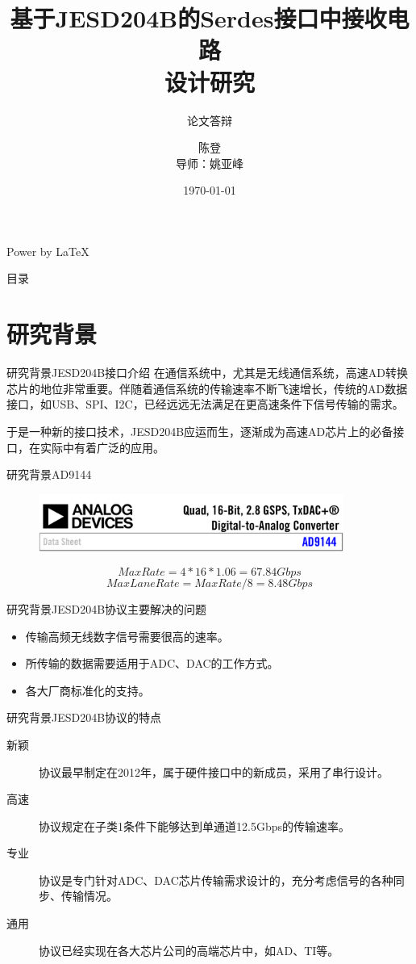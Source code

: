 \documentclass{beamer}
\title{基于JESD204B的Serdes接口中接收电路 \\ 设计研究}
\subtitle{论文答辩}
\author{陈登 \\ 导师：姚亚峰}
\date{\today}
\begin{document}
\begin{frame}
	\titlepage
	Power by \LaTeX
\end{frame}

\begin{frame}{目录}
	\tableofcontents
\end{frame}

\section{研究背景}

\begin{frame}{研究背景}{JESD204B接口介绍}
在通信系统中，尤其是无线通信系统，高速AD转换芯片的地位非常重要。伴随着通信系统的传输速率不断飞速增长，传统的AD数据接口，如USB、SPI、I2C，已经远远无法满足在更高速条件下信号传输的需求。

于是一种新的接口技术，JESD204B应运而生，逐渐成为高速AD芯片上的必备接口，在实际中有着广泛的应用。
\end{frame}

\begin{frame}{研究背景}{AD9144}
	\begin{figure}
	\includegraphics[width=10cm]{./img/ad9144.png}
	\end{figure}
	\begin{block}{}
		$$Max Rate = 4 * 16 * 1.06 = 67.84Gbps$$
		$$Max Lane Rate = Max Rate / 8 = 8.48Gbps$$
	\end{block}
\end{frame}


\begin{frame}{研究背景}{JESD204B协议主要解决的问题}
  \begin{itemize}
    \item 传输高频无线数字信号需要很高的速率。
    \item 所传输的数据需要适用于ADC、DAC的工作方式。
    \item 各大厂商标准化的支持。
  \end{itemize}
\end{frame}

\begin{frame}{研究背景}{JESD204B协议的特点}
  \begin{description}
    \item [新颖] 协议最早制定在2012年，属于硬件接口中的新成员，采用了串行设计。
    \item [高速] 协议规定在子类1条件下能够达到单通道12.5Gbps的传输速率。
    \item [专业] 协议是专门针对ADC、DAC芯片传输需求设计的，充分考虑信号的各种同步、传输情况。
    \item [通用] 协议已经实现在各大芯片公司的高端芯片中，如AD、TI等。
  \end{description}
\end{frame}
\end{document}
